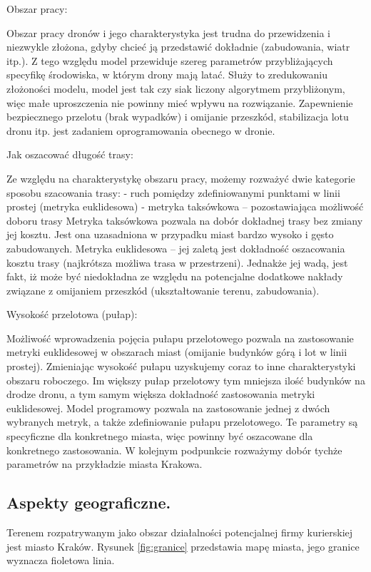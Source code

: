 \documentclass[twoside, 12pt]{article}
\begin{document}
\par Obszar pracy:
\par Obszar pracy dronów i jego charakterystyka jest trudna do przewidzenia i niezwykle złożona, gdyby chcieć ją przedstawić dokładnie (zabudowania, wiatr itp.). Z tego względu model przewiduje szereg parametrów przybliżających specyfikę środowiska, w którym drony mają latać. Służy to zredukowaniu złożoności modelu, model jest tak czy siak liczony algorytmem przybliżonym, więc małe uproszczenia nie powinny mieć wpływu na rozwiązanie. Zapewnienie bezpiecznego przelotu (brak wypadków) i omijanie przeszkód, stabilizacja lotu dronu itp. jest zadaniem oprogramowania obecnego w dronie.
\par Jak oszacować długość trasy:
\par Ze względu na charakterystykę obszaru pracy, możemy rozważyć dwie kategorie sposobu szacowania trasy:
- ruch pomiędzy zdefiniowanymi punktami w linii prostej (metryka euklidesowa)
- metryka taksówkowa – pozostawiająca możliwość doboru trasy
Metryka taksówkowa pozwala na dobór dokładnej trasy bez zmiany jej kosztu. Jest ona uzasadniona w przypadku miast bardzo wysoko i gęsto zabudowanych. 
Metryka euklidesowa – jej zaletą jest dokładność oszacowania kosztu trasy (najkrótsza możliwa trasa w przestrzeni). Jednakże jej wadą, jest fakt, iż może być niedokładna ze względu na potencjalne dodatkowe nakłady związane z omijaniem przeszkód (ukształtowanie terenu, zabudowania). 
\par Wysokość przelotowa (pułap):
\par Możliwość wprowadzenia pojęcia pułapu przelotowego pozwala na zastosowanie metryki euklidesowej w obszarach miast (omijanie budynków górą i lot w linii prostej). Zmieniając wysokość pułapu uzyskujemy coraz to inne charakterystyki obszaru roboczego. Im większy pułap przelotowy tym mniejsza ilość budynków na drodze dronu, a tym samym większa dokładność zastosowania metryki euklidesowej.
Model programowy pozwala na zastosowanie jednej z dwóch wybranych metryk, a także zdefiniowanie pułapu przelotowego. Te parametry są specyficzne dla konkretnego miasta, więc powinny być oszacowane dla konkretnego zastosowania. W kolejnym podpunkcie rozważymy dobór tychże parametrów na przykładzie miasta Krakowa.



\subsection{Aspekty geograficzne.}
\par Terenem rozpatrywanym jako obszar działalności potencjalnej firmy kurierskiej jest miasto Kraków. Rysunek \ref{fig:granice} przedstawia mapę miasta, jego granice wyznacza fioletowa linia.
\end{document}
